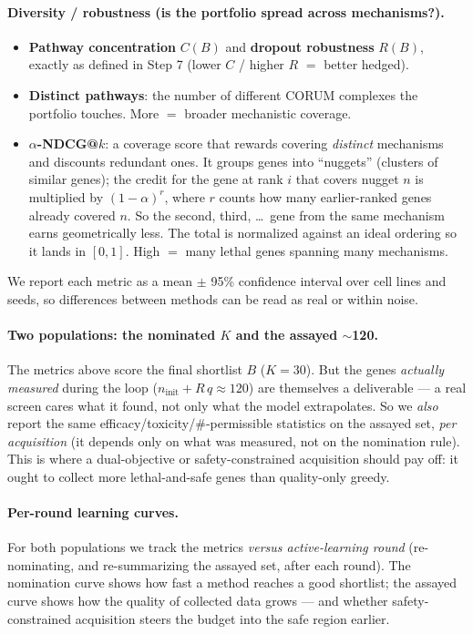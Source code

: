 \documentclass[11pt]{article}
\begin{document}
\paragraph{Diversity / robustness (is the portfolio spread across mechanisms?).}
\begin{itemize}[leftmargin=2em,itemsep=1pt]
\item \textbf{Pathway concentration} $C(B)$ and \textbf{dropout robustness} $R(B)$, exactly
as defined in Step 7 (lower $C$ / higher $R$ $=$ better hedged).
\item \textbf{Distinct pathways}: the number of different CORUM complexes the portfolio
touches. More $=$ broader mechanistic coverage.
\item \textbf{$\alpha$-NDCG@$k$}: a coverage score that rewards covering \emph{distinct}
mechanisms and discounts redundant ones. It groups genes into ``nuggets'' (clusters of
similar genes); the credit for the gene at rank $i$ that covers nugget $n$ is multiplied by
$(1-\alpha)^{r}$, where $r$ counts how many earlier-ranked genes already covered $n$. So the
second, third, \dots\ gene from the same mechanism earns geometrically less. The total is
normalized against an ideal ordering so it lands in $[0,1]$. High $=$ many lethal genes
spanning many mechanisms.
\end{itemize}
We report each metric as a mean $\pm$ 95\% confidence interval over cell lines and seeds, so
differences between methods can be read as real or within noise.

\paragraph{Two populations: the nominated $K$ and the assayed $\sim$120.} The metrics above
score the final shortlist $B$ ($K{=}30$). But the genes \emph{actually measured} during the
loop ($n_{\text{init}}+R\,q\approx 120$) are themselves a deliverable --- a real screen cares
what it found, not only what the model extrapolates. So we \emph{also} report the same
efficacy/toxicity/\#-permissible statistics on the assayed set, \emph{per acquisition} (it
depends only on what was measured, not on the nomination rule). This is where a dual-objective
or safety-constrained acquisition should pay off: it ought to collect more lethal-and-safe
genes than quality-only greedy.

\paragraph{Per-round learning curves.} For both populations we track the metrics
\emph{versus active-learning round} (re-nominating, and re-summarizing the assayed set, after
each round). The nomination curve shows how fast a method reaches a good shortlist; the
assayed curve shows how the quality of collected data grows --- and whether safety-constrained
acquisition steers the budget into the safe region earlier.
\end{document}
